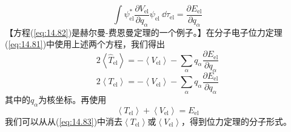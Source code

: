     \begin{equation}
        \int \psi_{\text{el}}^* \frac{\partial V_{\text{el}}}{\partial q_{\alpha}} \psi_{\text{el}}\:\dd \tau_{\text{el}} = \frac{\partial E_{\text{el}}}{\partial q_{\alpha}}
        \label{eq:14.82}
    \end{equation}
    【方程(\ref{eq:14.82})是赫尔曼-费恩曼定理的一个例子。】在分子电子位力定理(\ref{eq:14.81})中使用上述两个方程，我们得出
    \begin{equation*}
        2 \left\langle \hat{T}_{\text{el}} \right\rangle = -\left\langle V_{\text{el}} \right\rangle - \sum_{\alpha} q_{\alpha} \frac{\partial E_{\text{el}}}{\partial q_{\alpha}}
    \end{equation*}
    \begin{equation}
        2 \left\langle T_{\text{el}} \right\rangle = - \left\langle V_{\text{el}} \right\rangle - \sum_{\alpha} q_{\alpha} \frac{\partial E_{\text{el}}}{\partial q_{\alpha}}
        \label{eq:14.83}
    \end{equation}
    其中的$q_{\alpha}$为核坐标。再使用
    \begin{equation}
        \left\langle T_{\text{el}} \right\rangle + \left\langle V_{\text{el}} \right\rangle = E_{\text{el}}
        \label{eq:14.84}
    \end{equation}
    我们可以从从(\ref{eq:14.83})中消去$\left\langle T_{\text{el}} \right\rangle$或$\left\langle V_{\text{el}} \right\rangle$，得到位力定理的分子形式。

